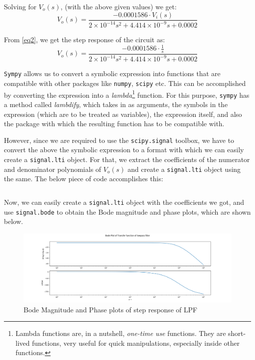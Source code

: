 \documentclass[11pt, a4paper, twoside]{article}
\begin{document}
    Solving for $V_o(s)$, (with the above given values) we get:
    \begin{equation}
        V_o(s) = \frac{-0.0001586\cdot V_i(s)}{2\times10^{-14}s^2 + 4.414\times10^{-9}s + 0.0002}
        \label{eq2}
    \end{equation}
    
    From \eqref{eq2}, we get the step response of the circuit as:
    \begin{equation}
        V_o(s) = \frac{-0.0001586\cdot \frac{1}{s}}{2\times10^{-14}s^2 + 4.414\times10^{-9}s + 0.0002}
    \end{equation}
    
    \texttt{Sympy} allows us to convert a symbolic expression into functions that are compatible with other packages like \texttt{numpy}, \texttt{scipy} etc. This can be accomplished by converting the expression into a \textit{lambda}\footnote{Lambda functions are, in a nutshell, \textit{one-time use} functions. They are short-lived functions, very useful for quick manipulations, especially inside other functions.} function. For this purpose, \texttt{sympy} has a method called \textit{lambdify}, which takes in as arguments, the symbols in the expression (which are to be treated as variables), the expression itself, and also the package with which the resulting function has to be compatible with.
    
    However, since we are required to use the \texttt{scipy.signal} toolbox, we have to convert the above the symbolic expression to a format with which we can easily create a \texttt{signal.lti} object. For that, we extract the coefficients of the numerator and denominator polynomials of $V_o(s)$ and create a \texttt{signal.lti} object using the same. The below piece of code accomplishes this:
    \inputminted[breaklines, linenos]{python}{code/sympyToLTI.py}
    
    Now, we can easily create a \texttt{signal.lti} object with the coefficients we got, and use \texttt{signal.bode} to obtain the Bode magnitude and phase plots, which are shown below.
    \begin{figure}[H]
        \centering
        \includegraphics[scale=0.4]{plots/Fig 1.png}
        \caption{Bode Magnitude and Phase plots of step response of LPF}
        \label{fig:Fig2}
    \end{figure}
    
\end{document}
